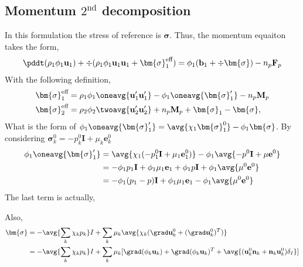 \subsection{Momentum $2^\text{nd}$ decomposition}
In this formulation the stress of reference is $\bm{\sigma}$.
Thus, the momentum equaiton takes the form,
\begin{align*}
    \pddt (\rho_1\phi_1 \textbf{u}_1 )
    + \div (\rho_1\phi_1 \textbf{u}_1  \textbf{u}_1
    + \bm{\sigma}^\text{eff}_1 )
    &= 
    \phi_1( \textbf{b}_1  +\div  \bm{\sigma})
    - n_p\textbf{F}_p \\
\end{align*}
With the following definition, 
\begin{align*}
    \bm{\sigma}^\text{eff}_1
    &=\rho_1 \phi_1 \oneavg{\textbf{u}_1'\textbf{u}_1'}
    - \phi_1 \oneavg{\bm{\sigma}_1'}
    - n_p\textbf{M}_p 
    \\
    \bm{\sigma}^\text{eff}_2
    &= \rho_2\phi_2 \twoavg{ \textbf{u}_2'\textbf{u}_2'} 
    + n_p\textbf{M}_p 
    +\bm{\sigma}_1 - \bm{\sigma},
\end{align*}
What is the form of 
$\phi_1 \oneavg{\bm{\sigma}_1'}
 = \avg{\chi_1 \bm{\sigma}_1^0}
 - \phi_1\bm{\sigma}
$. 
By considering $\bm{\sigma}_k^0 = -p_k^0 \textbf{I} + \mu_k \textbf{e}_k^0$
\begin{align*}
    \phi_1 \oneavg{\bm{\sigma}_1'}
 &= \avg{\chi_1 (-p_1^0 \textbf{I} + \mu_1 \textbf{e}_1^0)}
 - \phi_1\avg{-p^0 \textbf{I} + \mu \textbf{e}^0}\\
 &=  - \phi_1 p_1 \textbf{I} + \phi_1 \mu_1 \textbf{e}_1
 + \phi_1 p \textbf{I} + \phi_1 \avg{\mu^0 \textbf{e}^0}\\
 &=  - \phi_1 (p_1 - p) \textbf{I} 
 + \phi_1 \mu_1 \textbf{e}_1 
 - \phi_1 \avg{\mu^0 \textbf{e}^0}
\end{align*}
The last term is actually, 

Also, 
\begin{align*}
    \bm{\sigma}
    &= -\avg{\sum_k \chi_k p_k} I + \sum_k\mu_k \avg{\chi_k  (\grad\textbf{u}_k^0+(\grad\textbf{u}_k^0)^T)}\\
    &= -\avg{\sum_k \chi_k p_k} I + \sum_k\mu_k [\grad (\phi_k\textbf{u}_k)+ \grad (\phi_k\textbf{u}_k)^T
    + \avg{(\textbf{u}_k^0  \textbf{n}_k +  \textbf{n}_k\textbf{u}_k^0)\delta_I}]
\end{align*}

